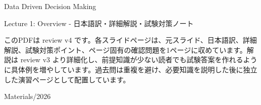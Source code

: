 \documentclass[a4paper,10pt]{article}
\begin{document}
\begin{titlepage}
\centering
\vspace*{2cm}
{\Huge Data Driven Decision Making\par}
\vspace{0.5cm}
{\Large Lecture 1: Overview - 日本語訳・詳細解説・試験対策ノート\par}
\vspace{1cm}
\begin{minipage}{0.88\textwidth}
このPDFは review v4 です。各スライドページは、元スライド、日本語訳、詳細解説、試験対策ポイント、ページ固有の確認問題を1ページに収めています。解説は review v3 より詳細化し、前提知識が少ない読者でも試験答案を作れるように具体例を増やしています。過去問は重複を避け、必要知識を説明した後に独立した演習ページとして配置しています。
\end{minipage}
\vfill
{\large Materials/2026}
\end{titlepage}
\tableofcontents
\clearpage

\end{document}
